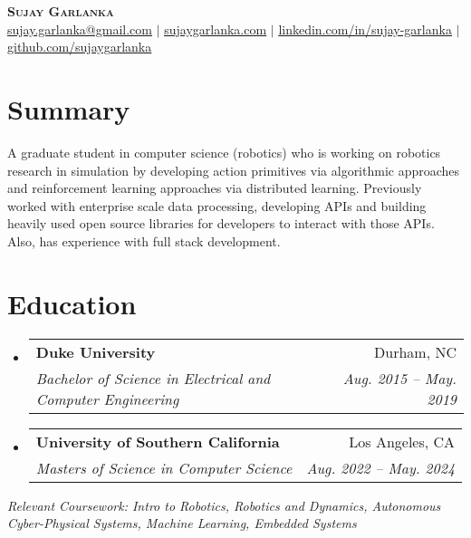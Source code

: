 \documentclass[letterpaper,10pt]{article}
\makeatletter
\newcommand{\resumeSubheading}[4]{
  \vspace{-2pt}\item
    \begin{tabular*}{0.97\textwidth}[t]{l@{\extracolsep{\fill}}r}
      \textbf{#1} & #2 \\
      \textit{\small#3} & \textit{\small #4} \\
    \end{tabular*}\vspace{-7pt}
}
\newcommand{\resumeSubHeadingListStart}{\begin{itemize}[leftmargin=0.15in, label={}]}
\newcommand{\resumeSubHeadingListEnd}{\end{itemize}}
\makeatother
\begin{document}

\begin{center}
    \textbf{\Huge \scshape Sujay Garlanka} \\ \vspace{1pt}
    \href{mailto:x@x.com}
    {\small \underline{sujay.garlanka@gmail.com}} $|$ 
    \href{https://www.sujaygarlanka.com}
    {\small \underline{sujaygarlanka.com}} $|$
    \href{https://www.linkedin.com/in/sujay-garlanka/}
    {\small \underline{linkedin.com/in/sujay-garlanka}} $|$
    \href{https://github.com/sujaygarlanka}
    {\small \underline{github.com/sujaygarlanka}}
\end{center}

\section{Summary}
    \small A graduate student in computer science (robotics) who is working on robotics research in simulation by developing action primitives via algorithmic approaches and reinforcement learning approaches via distributed learning. Previously worked with enterprise scale data processing, developing APIs and building heavily used open source libraries for developers to interact with those APIs. Also, has experience with full stack development. 

\section{Education}
  \resumeSubHeadingListStart
    \resumeSubheading
      {Duke University}{Durham, NC}
      {Bachelor of Science in Electrical and Computer Engineering}{Aug. 2015 -- May. 2019}
    \resumeSubheading
      {University of Southern California}{Los Angeles, CA}
      {Masters of Science in Computer Science}{Aug. 2022 -- May. 2024}
  \resumeSubHeadingListEnd
  \emph{Relevant Coursework: Intro to Robotics, Robotics and Dynamics, Autonomous Cyber-Physical Systems, Machine Learning, Embedded Systems}
\end{document}
